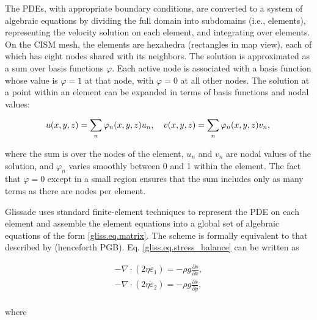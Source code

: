 The PDEs, with appropriate boundary conditions, are converted to a system of algebraic equations
by dividing the full domain into subdomains (i.e., elements), representing the velocity solution on each element,
and integrating over elements. On the CISM mesh, the elements are hexahedra (rectangles
in map view), each of which has eight nodes shared with its neighbors.
The solution is approximated as a sum over basis functions $\varphi$. 
Each active node is associated with a basis function whose value is $\varphi = 1$ at that node,
with $\varphi = 0$ at all other nodes. The solution at a point
within an element can be expanded in terms of basis functions and nodal values:

\begin{equation}
\label{gliss.eq.velo_expansion}  
   u(x,y,z) = \sum\limits_{n}{{{\varphi }_{n}(x,y,z)}{{u}_{n}}}, \quad 
   v(x,y,z) = \sum\limits_{n}{{{\varphi }_{n}(x,y,z)}{{v}_{n}}},  \\
\end{equation}

\noindent
where the sum is over the nodes of the element, $u_n$ and $v_n$ are nodal
values of the solution, and $\varphi_n$ varies smoothly between 0 and 1 within the element.
The fact that $\varphi = 0$ except in a small region ensures that the sum includes only
as many terms as there are nodes per element.

Glissade uses standard finite-element techniques to represent the PDE on each element and assemble
the element equations into a global set of algebraic equations of the form \eqref{gliss.eq.matrix}.
The scheme is formally equivalent to that described by \citet{Perego2012} (henceforth PGB).
Eq. \eqref{gliss.eq.stress_balance} can be written as

\begin{equation}
  \label{gliss.eq.Perego12}
  \begin{split}
    -\nabla \cdot (2\eta {{{\dot{\varepsilon }}}_{1}}) = -\rho g\frac{\partial s}{\partial x}, \\
    -\nabla \cdot (2\eta {{{\dot{\varepsilon }}}_{2}}) = -\rho g\frac{\partial s}{\partial y}, \\
  \end{split}
\end{equation}

\noindent
where

